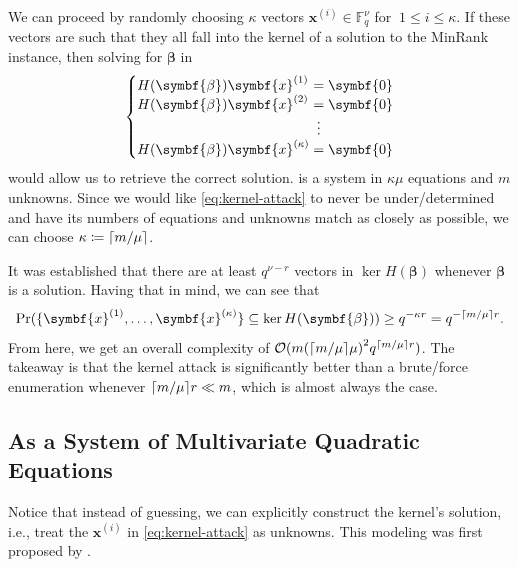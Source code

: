 \documentclass[version=last, paper=A4, parskip=half, oneside]{scrbook}
\theoremstyle{plain}
\theoremstyle{definition}
\theoremstyle{remark}
\renewcommand*{\vec}{\symbf}
\newcommand*{\FF}{\ensuremath{\mathbb{F}}}
\DeclarePairedDelimiter{\ceil}{\lceil}{\rceil}
\begin{document}
We can proceed by randomly choosing $\kappa$ vectors
\(\vec{x}^{(i)} \in \FF_q^{\nu}\) for \(\ 1 \le i \le \kappa\).  If these
vectors are such that they all fall into the kernel of a solution to the MinRank
instance, then solving for \(\vec{\beta}\) in
\begin{equation}\label{eq:kernel-attack}
  \setlength{\arraycolsep}{0pt}
  \newcolumntype{B}{>{{}}c<{{}}}
  \left\{
    \begin{array}{l B l}
      H(\vec{\beta}) \vec{x}^{(1)} & = & \vec{0} \\
      H(\vec{\beta}) \vec{x}^{(2)} & = & \vec{0} \\
                                   & \vdots & \\
      H(\vec{\beta}) \vec{x}^{(\kappa)} & = & \vec{0}
    \end{array}
  \right.
\end{equation}
would allow us to retrieve the correct solution.   is a
system in \(\kappa \mu\) equations and \(m\) unknowns.  Since we would like
\cref{eq:kernel-attack} to never be under\-/determined and have its numbers of
equations and unknowns match as closely as possible, we can choose
\(\kappa \coloneqq \ceil{m / {\mu}}\).

It was established that there are at least \(q^{\nu - r}\) vectors in
\(\ker H(\vec{\beta})\) whenever \(\vec{\beta}\) is a solution.  Having that in
mind, we can see that
\[
  \Pr(\{\vec{x}^{(1)}, \ldots, \vec{x}^{(\kappa)}\} \subseteq \ker H(\vec{\beta})) \ge q^{-\kappa r} = q^{-\ceil{m / {\mu}} r}\text.
\]
From here, we get an overall complexity of
\(\mathcal{O}(m {(\ceil{m / {\mu}} \mu)}^2 q^{\ceil{m / {\mu}} r})\).  The
takeaway is that the kernel attack is significantly better than a brute\-/force
enumeration whenever \(\ceil{m / {\mu}} r \ll m\), which is almost always the
case.

\subsection{As a System of Multivariate Quadratic Equations}

Notice that instead of guessing, we can explicitly construct the kernel's
solution, i.e., treat the \(\vec{x}^{(i)}\) in \cref{eq:kernel-attack} as
unknowns.  This modeling was first proposed by \textcite{KS99}.
\end{document}
